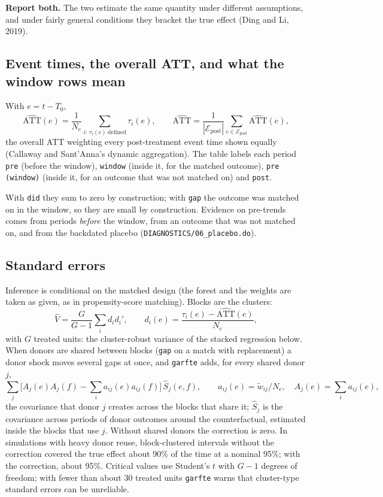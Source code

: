 \documentclass[11pt,a4paper]{article}
\newcommand{\code}[1]{\texttt{#1}}
\begin{document}
\medskip
\noindent\textbf{Report both.} The two estimate the same quantity under different assumptions,
and under fairly general conditions they bracket the true effect (Ding and Li, 2019).

\subsection{Event times, the overall ATT, and what the window rows mean}
With $e = t - T_0$,
\[
\widehat{\text{ATT}}(e) = \frac{1}{N_e}\sum_{i:\,\tau_i(e)\ \text{defined}} \tau_i(e),\qquad
\widehat{\text{ATT}} = \frac{1}{|\mathcal E_{\text{post}}|}\sum_{e\in\mathcal E_{\text{post}}}\widehat{\text{ATT}}(e),
\]
the overall ATT weighting every post-treatment event time shown equally (Callaway and
Sant'Anna's dynamic aggregation). The table labels each period \code{pre} (before the window),
\code{window} (inside it, for the matched outcome), \code{pre (window)} (inside it, for an outcome
that was not matched on) and \code{post}.

 With \code{did} they
sum to zero by construction; with \code{gap} the outcome was matched on in the window, so they are
small by construction. Evidence on pre-trends comes from periods \emph{before} the window, from an
outcome that was not matched on, and from the backdated placebo (\code{DIAGNOSTICS/06\_placebo.do}).

\subsection{Standard errors}
Inference is conditional on the matched design (the forest and the weights are taken as given, as
in propensity-score matching). Blocks are the clusters:
\[
\widehat V = \frac{G}{G-1}\sum_{i} d_i d_i',\qquad d_i(e) = \frac{\tau_i(e)-\widehat{\text{ATT}}(e)}{N_e},
\]
with $G$ treated units: the cluster-robust variance of the stacked regression below. When donors are
shared between blocks (\code{gap} on a match with replacement) a donor shock moves several gaps at
once, and \code{garfte} adds, for every shared donor $j$,
\[
\sum_j \Big[A_j(e)A_j(f) - \sum_i a_{ij}(e)a_{ij}(f)\Big]\,\widehat S_j(e,f),\qquad
a_{ij}(e) = \tilde w_{ij}/N_e,\quad A_j(e)=\textstyle\sum_i a_{ij}(e),
\]
the covariance that donor $j$ creates across the blocks that share it; $\widehat S_j$ is the
covariance across periods of donor outcomes around the counterfactual, estimated inside the blocks
that use $j$. Without shared donors the correction is zero. In simulations with heavy donor reuse,
block-clustered intervals without the correction covered the true effect about 90\% of the time at
a nominal 95\%; with the correction, about 95\%. Critical values use Student's $t$ with $G-1$
degrees of freedom; with fewer than about 30 treated units \code{garfte} warns that cluster-type
standard errors can be unreliable.
\end{document}
